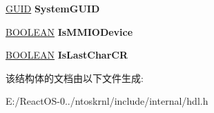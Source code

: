 \begin{DoxyCompactItemize}
\mbox{\label{struct___h_e_a_d_l_e_s_s___g_l_o_b_a_l_s_a0abfb7c2479ab2f4522ed5b4b6108b20}} 
\hyperlink{interface_g_u_i_d}{G\+U\+ID} {\bfseries System\+G\+U\+ID}
\item 
\mbox{\label{struct___h_e_a_d_l_e_s_s___g_l_o_b_a_l_s_a5ad2e19f66035f3f505f89a18964890a}} 
\hyperlink{_processor_bind_8h_a112e3146cb38b6ee95e64d85842e380a}{B\+O\+O\+L\+E\+AN} {\bfseries Is\+M\+M\+I\+O\+Device}
\item 
\mbox{\label{struct___h_e_a_d_l_e_s_s___g_l_o_b_a_l_s_a37d144d00be829cb348f56695a579ae2}} 
\hyperlink{_processor_bind_8h_a112e3146cb38b6ee95e64d85842e380a}{B\+O\+O\+L\+E\+AN} {\bfseries Is\+Last\+Char\+CR}
\end{DoxyCompactItemize}


该结构体的文档由以下文件生成\+:\begin{DoxyCompactItemize}
\item 
E\+:/\+React\+O\+S-\/0../ntoskrnl/include/internal/hdl.\+h\end{DoxyCompactItemize}
